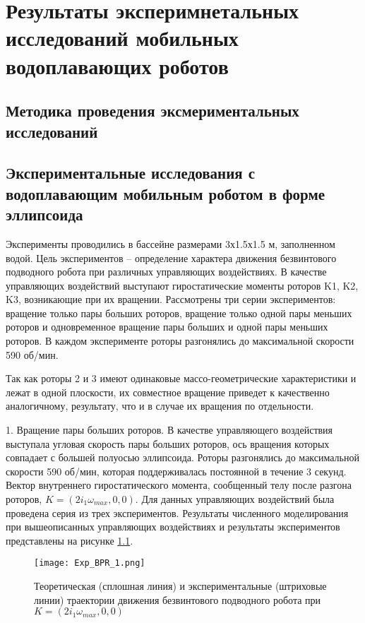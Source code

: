 \chapter{Результаты эксперимнетальных исследований мобильных водоплавающих роботов}\label{ch:ch4}

\section{Методика проведения эксмериментальных исследований}\label{sec:ch4/sec1}

\section{Экспериментальные исследования с водоплавающим мобильным роботом в форме эллипсоида}\label{sec:ch4/sec2}

Эксперименты проводились в бассейне размерами 3х1.5х1.5 м, заполненном водой. Цель экспериментов -- определение характера движения безвинтового подводного робота при различных управляющих воздействиях. В качестве управляющих воздействий выступают гиростатические моменты роторов K1, K2, K3, возникающие при их вращении. Рассмотрены три серии экспериментов: вращение только пары больших роторов, вращение только одной пары меньших роторов и одновременное вращение пары больших и одной пары меньших роторов. В каждом эксперименте роторы разгонялись до максимальной скорости 590 об/мин.

Так как роторы 2 и 3 имеют одинаковые массо-геометрические характеристики и лежат в одной плоскости, их совместное вращение приведет к качественно аналогичному, результату, что и в случае их вращения по отдельности.


1.	Вращение пары больших роторов. В качестве управляющего воздействия выступала угловая скорость пары больших роторов, ось вращения которых совпадает с большей полуосью эллипсоида. Роторы разгонялись до максимальной скорости 590 об/мин, которая поддерживалась постоянной в течение 3 секунд. Вектор внутреннего гиростатического момента, сообщенный телу после разгона роторов, $K = (2i_1\omega_{max}, 0, 0)$. Для данных управляющих воздействий была проведена серия из трех экспериментов. Результаты численного моделирования при вышеописанных управляющих воздействиях и результаты экспериментов представлены на рисунке \ref{Exp_BPR_1}.

\begin{figure}[ht]
	\centering
	\texttt{[image: Exp\_BPR\_1.png]}%
	\caption{Теоретическая (сплошная линия) и экспериментальные (штриховые линии) траектории движения безвинтового подводного робота при $K = (2i_1\omega_{max}, 0, 0)$}
	\label{Exp_BPR_1}
\end{figure}


